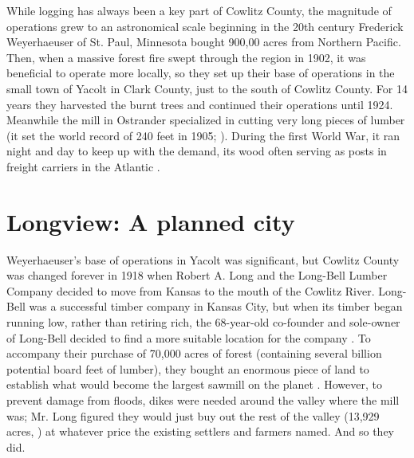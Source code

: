 While logging has always been a key part of Cowlitz County, the magnitude of operations grew to an astronomical scale beginning in the 20th century Frederick Weyerhaeuser of St. Paul, Minnesota bought 900,00 acres from Northern Pacific. Then, when a massive forest fire swept through the region in 1902, it was beneficial to operate more locally, so they set up their base of operations in the small town of Yacolt in Clark County, just to the south of Cowlitz County. For 14 years they harvested the burnt trees and continued their operations until 1924. Meanwhile the mill in Ostrander specialized in cutting very long pieces of lumber (it set the world record of 240 feet in 1905; \citealt[19]{olson_1948}). During the first World War, it ran night and day to keep up with the demand, its wood often serving as posts in freight carriers in the Atlantic \citep[126-129]{urrutia_1998}.





\section{Longview: A planned city}
\label{sec:longview_a_planned_city}

Weyerhaeuser's base of operations in Yacolt was significant, but Cowlitz County was changed forever in 1918 when Robert A. Long and the Long-Bell Lumber Company decided to move from Kansas to the mouth of the Cowlitz River. Long-Bell was a successful timber company in Kansas City, but when its timber began running low, rather than retiring rich, the 68-year-old co-founder and sole-owner of Long-Bell decided to find a more suitable location for the company \citep[1]{mcclelland_1976}. To accompany their purchase of 70,000 acres of forest (containing several billion potential board feet of lumber), they bought an enormous piece of land to establish what would become the largest sawmill on the planet \citep[132-136]{urrutia_1998}. However, to prevent damage from floods, dikes were needed around the valley where the mill was; Mr. Long figured they would just buy out the rest of the valley (13,929 acres, \citealt[18]{mcclelland_1976}) at whatever price the existing settlers and farmers named. And so they did.

